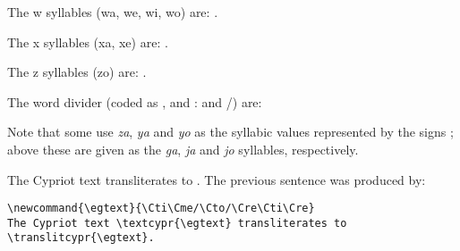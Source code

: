 \documentclass{article}
\begin{document}

    The w syllables (wa, we, wi, wo) are: .


    The x syllables (xa, xe) are: .


    The z syllables (zo) are: .
  
  
    The word divider (coded as , and : and /) are: \textcypr{, : /}

    Note that some use \textit{za}, \textit{ya} and \textit{yo} as the
syllabic values represented by the signs \textcypr{\Cza\ \Cya\ \Cyo}; above
these are given as the \textit{ga}, \textit{ja} and \textit{jo} syllables,
respectively.


\newcommand{\egtext}{\Cti\Cme/\Cto/\Cre\Cti\Cre}
The Cypriot text \textcypr{\egtext} transliterates to
\translitcypr{\egtext}.
The previous sentence was produced by:

\begin{verbatim}
\newcommand{\egtext}{\Cti\Cme/\Cto/\Cre\Cti\Cre}
The Cypriot text \textcypr{\egtext} transliterates to
\translitcypr{\egtext}.
\end{verbatim}

\clearpage
\end{document}
